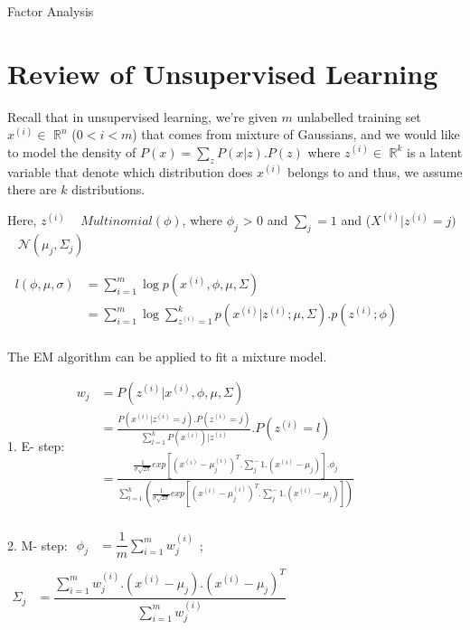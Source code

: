 \documentclass[12pt]{article}
\begin{document}

\begin{center}
    \Large Factor Analysis
\end{center}

\section{Review of Unsupervised Learning}

Recall that in unsupervised learning, we're given $m$ unlabelled training set $x^{(i)}\in$ $\mathbb{R}^n$ ($0<i<m$) that comes from mixture of Gaussians, and we would like to model the density of $P(x)=\sum_{z} P(x | z) . P(z)$ where $z^{(i)}\in$  $\mathbb{R}^k$ is a latent variable that denote which distribution does $x^{(i)}$ belongs to and thus, we assume there are $k$ distributions. 

Here, $z^{(i)}$ ~ $Multinomial(\phi)$,  where $\phi_{j}$ > 0 and $\sum_{j} = 1$ and ($X^{(i)}|z^{(i)}=j)$ ~ $\mathcal{N}(\mu_{j}, 
\Sigma_{j})$ 

$\begin{aligned}
    \ l(\phi, \mu, \sigma) &= \sum_{i=1}^{m}\log p(x^{(i)}, \phi, \mu, \Sigma) \  \\
    &= \sum_{i=1}^{m}\log \sum_{z^{(i)}=1}^{k} p(x^{(i)}|z^{(i)}; \mu, \Sigma) . p(z^{(i)}; \phi) \ \textrm{} \\
\end{aligned}$
    
The EM algorithm can be applied to fit a mixture model. 

1. E- step:
$\begin{aligned}
    \ w_{j} &= P(z^{(i)}|x^{(i)}, \phi, \mu, \Sigma) \  \\
    \ &= \frac{P(x^{(i)}|z^{(i)}=j) . P(z^{(i)}=j)}{\sum_{l=1}^{k}P(x^{(i)})|z^{(i)}} . P(z^{(i)}=l)\ \\
    \ &= \frac{\frac{1}{{\sigma \sqrt {2\pi } }}  exp[(x^{(i)}-\mu_{j}^{(i)})^T . \sum_{j}^-1 . (x^{(i)} - \mu_{j})] . \phi_{j}}
    {\sum_{l=1}^{k}(\frac{1}{{\sigma \sqrt {2\pi } }}  exp[(x^{(i)}-\mu_{j}^{(i)})^T . \sum_{j}^-1 . (x^{(i)} - \mu_{j})]) } \ \\
\end{aligned}$


2. M- step:
$\begin{aligned}
    \phi_{j}&=\dfrac{1}{m} \sum_{i=1}^{m} w_{j}^{(i)}\\
\end{aligned}$;      $\begin{aligned}
    \Sigma_{j}&=\dfrac{\sum_{i=1}^{m} w_{j}^{(i)}.(x^{(i)}-\mu_{j}).(x^{(i)}-\mu_{j})^T}{\sum_{i=1}^{m} w_{j}^{(i)}}\\
\end{aligned}$
\end{document}

